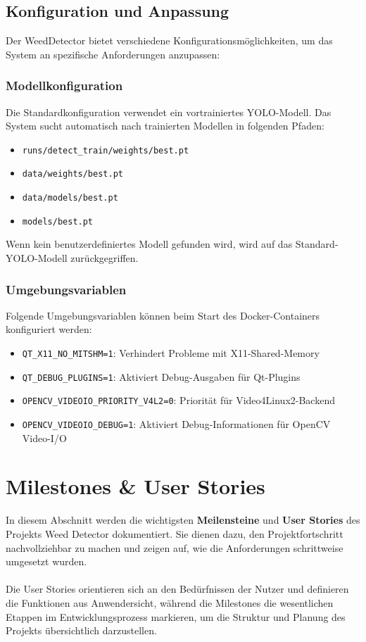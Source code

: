 \documentclass[12pt, a4paper]{scrreprt}
\begin{document}
\section{Konfiguration und Anpassung}
Der WeedDetector bietet verschiedene Konfigurationsmöglichkeiten, um das System an spezifische Anforderungen anzupassen:

\subsection{Modellkonfiguration}
Die Standardkonfiguration verwendet ein vortrainiertes YOLO-Modell. Das System sucht automatisch nach trainierten Modellen in folgenden Pfaden:
\begin{itemize}
    \item \texttt{runs/detect\_train/weights/best.pt}
    \item \texttt{data/weights/best.pt}
    \item \texttt{data/models/best.pt}
    \item \texttt{models/best.pt}
\end{itemize}

Wenn kein benutzerdefiniertes Modell gefunden wird, wird auf das Standard-YOLO-Modell zurückgegriffen.

\subsection{Umgebungsvariablen}
Folgende Umgebungsvariablen können beim Start des Docker-Containers konfiguriert werden:
\begin{itemize}
    \item \texttt{QT\_X11\_NO\_MITSHM=1}: Verhindert Probleme mit X11-Shared-Memory
    \item \texttt{QT\_DEBUG\_PLUGINS=1}: Aktiviert Debug-Ausgaben für Qt-Plugins
    \item \texttt{OPENCV\_VIDEOIO\_PRIORITY\_V4L2=0}: Priorität für Video4Linux2-Backend
    \item \texttt{OPENCV\_VIDEOIO\_DEBUG=1}: Aktiviert Debug-Informationen für OpenCV Video-I/O
\end{itemize}

\chapter{Milestones \& User Stories}
In diesem Abschnitt werden die wichtigsten \textbf{Meilensteine} und \textbf{User Stories} des Projekts Weed Detector dokumentiert. Sie dienen dazu, den Projektfortschritt nachvollziehbar zu machen und zeigen auf, wie die Anforderungen schrittweise umgesetzt wurden.\\
\\
Die User Stories orientieren sich an den Bedürfnissen der Nutzer und definieren die Funktionen aus Anwendersicht, während die Milestones die wesentlichen Etappen im Entwicklungsprozess markieren, um die Struktur und Planung des Projekts übersichtlich darzustellen.
\end{document}
